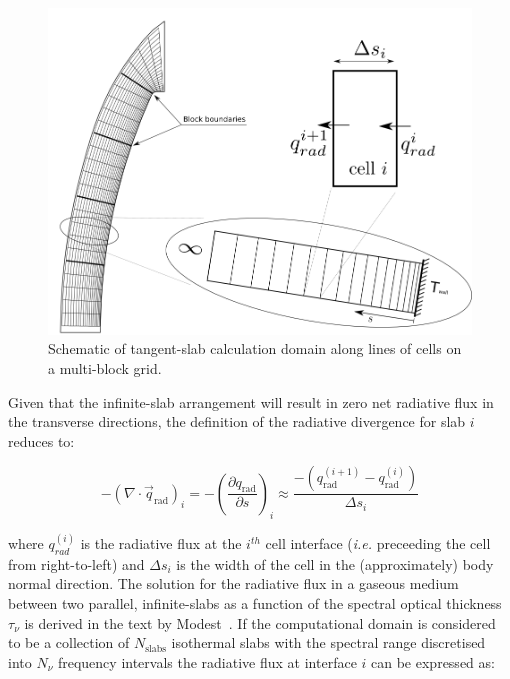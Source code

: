 \begin{figure}[ht]
 \center
 \includegraphics[scale=0.85]{radiation/figures/FireII-TS.png}
 \caption{Schematic of tangent-slab calculation domain along lines of cells on a multi-block grid.}
 \label{fig:FireII-TS}
\end{figure} 

Given that the infinite-slab arrangement will result in zero net radiative flux in the transverse directions, the definition of the radiative divergence for slab $i$ reduces to:

\begin{equation}
 - \left( \nabla \cdot \vec{q}_\text{rad} \right )_{i} = - \left ( \frac{\partial q_\text{rad}}{\partial s} \right )_{i} \approx \frac{ - \left ( q_\text{rad}^{(i+1)} - q_\text{rad}^{(i)} \right ) }{ \Delta s_{i} }
 \label{eq:divq_TS}
\end{equation}

\noindent where $q_{rad}^{(i)}$ is the radiative flux at the $i^{th}$ cell interface (\textit{i.e.} preceeding the cell from right-to-left) and $\Delta s_{i}$ is the width of the cell in the (approximately) body normal direction.
The solution for the radiative flux in a gaseous medium between two parallel, infinite-slabs as a function of the spectral optical thickness $\tau_{\nu}$ is derived in the text by Modest~\cite{Mod03}.
If the computational domain is considered to be a collection of $N_\text{slabs}$ isothermal slabs with the spectral range discretised into $N_\nu$ frequency intervals the radiative flux at interface $i$ can be expressed as:

